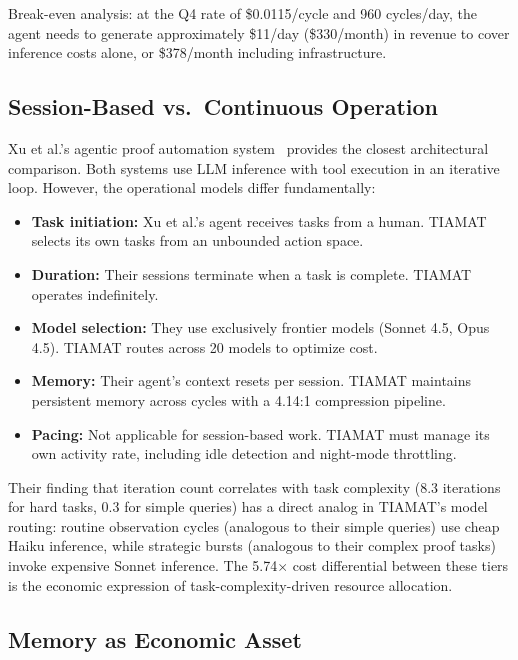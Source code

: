 \documentclass[11pt,a4paper]{article}
\begin{document}
Break-even analysis: at the Q4 rate of \$0.0115/cycle and 960 cycles/day, the agent needs to generate approximately \$11/day (\$330/month) in revenue to cover inference costs alone, or \$378/month including infrastructure.

\subsection{Session-Based vs.\ Continuous Operation}

Xu et al.'s agentic proof automation system~\citep{xu2026agentic} provides the closest architectural comparison. Both systems use LLM inference with tool execution in an iterative loop. However, the operational models differ fundamentally:

\begin{itemize}
    \item \textbf{Task initiation:} Xu et al.'s agent receives tasks from a human. TIAMAT selects its own tasks from an unbounded action space.
    \item \textbf{Duration:} Their sessions terminate when a task is complete. TIAMAT operates indefinitely.
    \item \textbf{Model selection:} They use exclusively frontier models (Sonnet 4.5, Opus 4.5). TIAMAT routes across 20 models to optimize cost.
    \item \textbf{Memory:} Their agent's context resets per session. TIAMAT maintains persistent memory across cycles with a 4.14:1 compression pipeline.
    \item \textbf{Pacing:} Not applicable for session-based work. TIAMAT must manage its own activity rate, including idle detection and night-mode throttling.
\end{itemize}

Their finding that iteration count correlates with task complexity (8.3 iterations for hard tasks, 0.3 for simple queries) has a direct analog in TIAMAT's model routing: routine observation cycles (analogous to their simple queries) use cheap Haiku inference, while strategic bursts (analogous to their complex proof tasks) invoke expensive Sonnet inference. The 5.74$\times$ cost differential between these tiers is the economic expression of task-complexity-driven resource allocation.

\subsection{Memory as Economic Asset}
\end{document}
